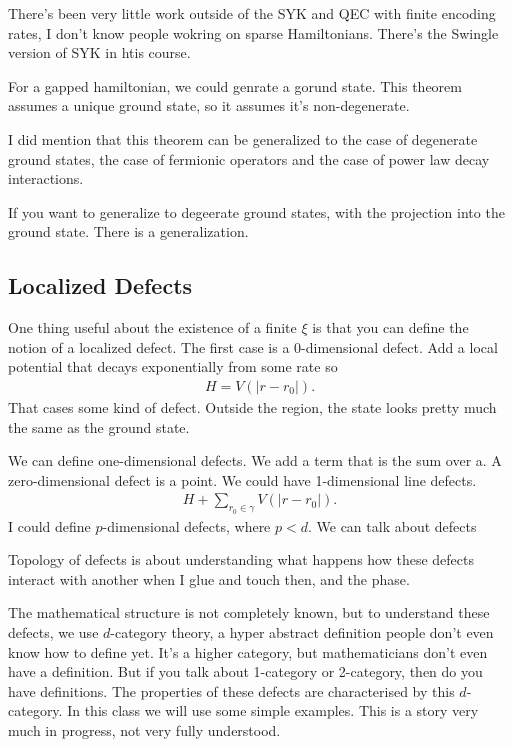 There's been very little work outside of the SYK and QEC with finite encoding
rates, I don't know people wokring on sparse Hamiltonians.
There's the Swingle version of SYK in htis course.

\begin{question}
    For a gapped hamiltonian, we could genrate a gorund state.
    This theorem assumes a unique ground state, 
    so it assumes it's non-degenerate.
\end{question}
I did mention that this theorem can be generalized to the case of degenerate
ground states,
the case of fermionic operators
and the case of power law decay interactions.

If you want to generalize to degeerate ground states, with the projection into
the ground state.
There is a generalization.


\subsection{Localized Defects}
One thing useful about the existence of a finite $\xi$
is that you can define the notion of a localized defect.
The first case is a 0-dimensional defect.
Add a local potential that decays exponentially from some rate so
\begin{align}
    H = V(|r - r_0|).
\end{align}
That cases some kind of defect.
Outside the region, the state looks pretty much the same as the ground state.

We can define one-dimensional defects.
We add a term that is the sum over a.
A zero-dimensional defect is a point.
We could have 1-dimensional line defects.
\begin{align}
    H + \sum_{r_0\in\gamma} V(|r - r_0|).
\end{align}
I could define $p$-dimensional defects, where $p< d$.
We can talk about defects 

Topology of defects is about understanding what happens how these defects
interact with another when I glue and touch then,
and the phase.

The mathematical structure is not completely known,
but to understand these defects, we use $d$-category theory,
a hyper abstract definition people don't even know how to define yet.
It's a higher category, but mathematicians don't even have a definition.
But if you talk about 1-category or 2-category, then do you have definitions.
The properties of these defects are characterised by this $d$-category.
In this class we will use some simple examples.
This is a story very much in progress, not very fully understood.

